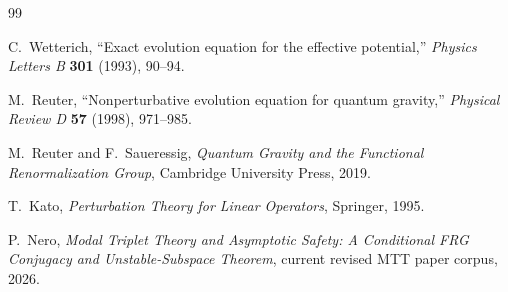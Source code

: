 \documentclass[11pt]{article}
\theoremstyle{definition}
\theoremstyle{remark}
\begin{document}
\begin{thebibliography}{99}

C.~Wetterich,
``Exact evolution equation for the effective potential,''
\emph{Physics Letters B} \textbf{301} (1993), 90--94.

M.~Reuter,
``Nonperturbative evolution equation for quantum gravity,''
\emph{Physical Review D} \textbf{57} (1998), 971--985.

M.~Reuter and F.~Saueressig,
\emph{Quantum Gravity and the Functional Renormalization Group},
Cambridge University Press, 2019.

T.~Kato,
\emph{Perturbation Theory for Linear Operators},
Springer, 1995.

P.~Nero,
\emph{Modal Triplet Theory and Asymptotic Safety: A Conditional FRG
Conjugacy and Unstable-Subspace Theorem},
current revised MTT paper corpus, 2026.

\end{thebibliography}
\end{document}
